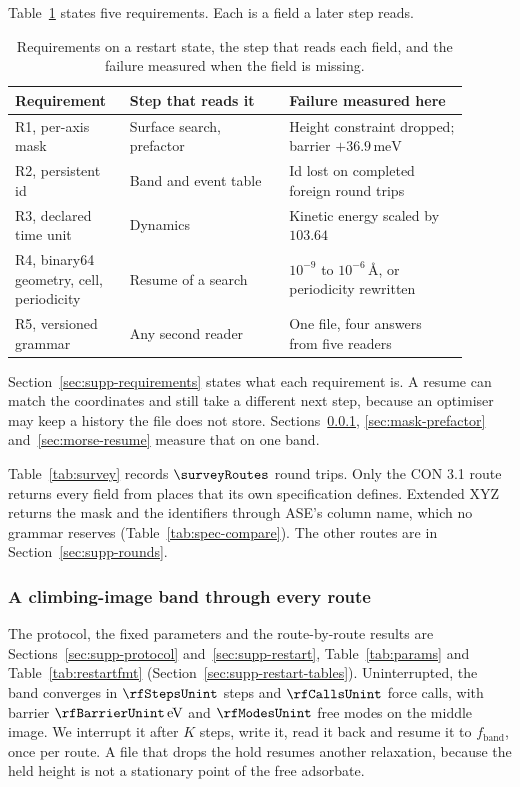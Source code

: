 Table~\ref{tab:requirements} states five requirements.
Each is a field a later step reads.

\begin{table}[tbp]
\centering
\small
\caption{Requirements on a restart state, the step that reads each field, and the failure measured when the field is missing.}
\label{tab:requirements}
\begin{tabular}{p{0.22\linewidth}p{0.32\linewidth}p{0.36\linewidth}}
\toprule
Requirement & Step that reads it & Failure measured here \\
\midrule
R1, per-axis mask & Surface search, prefactor & Height constraint dropped; barrier \(+36.9\,\mathrm{meV}\) \\
R2, persistent id & Band and event table & Id lost on completed foreign round trips \\
R3, declared time unit & Dynamics & Kinetic energy scaled by \(103.64\) \\
R4, binary64 geometry, cell, periodicity & Resume of a search & \(10^{-9}\) to \(10^{-6}\,\text{\AA}\), or periodicity rewritten \\
R5, versioned grammar & Any second reader & One file, four answers from five readers \\
\bottomrule
\end{tabular}
\end{table}

Section~\ref{sec:supp-requirements} states what each requirement is.
A resume can match the coordinates and still take a different next step, because an optimiser may keep a history the file does not store.
Sections~\ref{sec:climb-band}, \ref{sec:mask-prefactor} and~\ref{sec:morse-resume} measure that on one band.

Table~\ref{tab:survey} records \(\surveyRoutes\) round trips.
Only the CON 3.1 route returns every field from places that its own specification defines.
Extended XYZ returns the mask and the identifiers through ASE's column name, which no grammar reserves (Table~\ref{tab:spec-compare}).
The other routes are in Section~\ref{sec:supp-rounds}.

\subsubsection{A climbing-image band through every route}\label{sec:climb-band}
The protocol, the fixed parameters and the route-by-route results are Sections~\ref{sec:supp-protocol} and~\ref{sec:supp-restart}, Table~\ref{tab:params} and Table~\ref{tab:restartfmt} (Section~\ref{sec:supp-restart-tables}).
Uninterrupted, the band converges in \(\rfStepsUnint\) steps and
\(\rfCallsUnint\) force calls, with barrier
\(\rfBarrierUnint\,\mathrm{eV}\) and \(\rfModesUnint\) free modes on the
middle image.
We interrupt it after \(K\) steps, write it, read it back and resume it
to \(f_{\mathrm{band}}\), once per route.
A file that drops the hold resumes another relaxation, because the held height is not a stationary point of the free adsorbate.

